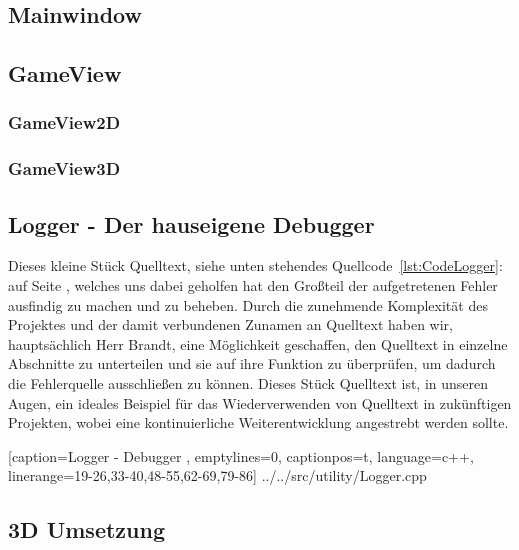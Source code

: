 \documentclass[a4paper]{scrartcl}
\begin{document}
\subsection{Mainwindow}\label{ch:Mainwindow}
\subsection{GameView}\label{ch:GameView}
\subsubsection{GameView2D}\label{ch:GameView2D}
\subsubsection{GameView3D}\label{ch:GameView3D}

\newpage
\subsection{Logger - Der hauseigene Debugger}\label{ch:Logger}
Dieses kleine Stück Quelltext, siehe unten stehendes Quellcode~\ref{lst:CodeLogger}: auf Seite \pageref{lst:CodeLogger}, welches uns dabei geholfen hat den Großteil der aufgetretenen Fehler ausfindig zu machen und zu beheben. Durch die zunehmende Komplexität des Projektes und der damit verbundenen Zunamen an Quelltext haben wir, hauptsächlich Herr Brandt, eine Möglichkeit geschaffen, den Quelltext in einzelne Abschnitte zu unterteilen und sie auf ihre Funktion zu überprüfen, um dadurch die Fehlerquelle ausschließen zu können. Dieses Stück Quelltext ist, in unseren Augen, ein ideales Beispiel für das Wiederverwenden von Quelltext in zukünftigen Projekten, wobei eine kontinuierliche Weiterentwicklung angestrebt werden sollte.

    [caption={Logger - Debugger} 	%
    	\label{lst:CodeLogger},			%
    emptylines=0,					%
    captionpos=t,					%
    language=c++,					%
    linerange={19-26,33-40,48-55,62-69,79-86}]%
{../../src/utility/Logger.cpp}		%
\subsection{3D Umsetzung}\label{ch:3DUmsetzung}

\end{document}
